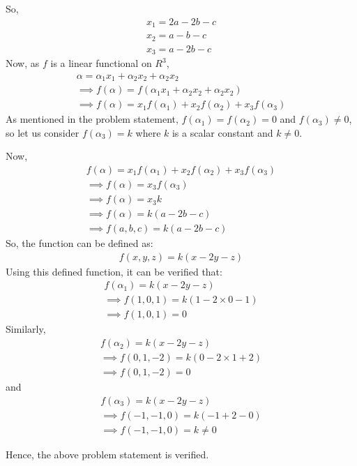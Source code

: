 \documentclass[journal,12pt,twocolumn]{IEEEtran}
\renewcommand\thesection{\arabic{section}}
\begin{document}
So, 
\begin{align}
x_1 = 2a-2b-c\\
x_2= a-b-c \\
x_3= a-2b-c
\end{align}
Now, as $f$ is a linear functional on $R^3$,
\begin{align}
\alpha = \alpha_1 x_1 + \alpha_2 x_2 + \alpha_2 x_2\\
\implies f(\alpha) = f(\alpha_1 x_1 + \alpha_2 x_2 + \alpha_2 x_2)\\
\implies f(\alpha) = x_1 f(\alpha_1) + x_2f(\alpha_2)+ x_3f(\alpha_3)
\end{align}
As mentioned in the problem statement, $f(\alpha_1)=f(\alpha_2)=0$ and $f(\alpha_3)\neq 0$, so let us consider $f(\alpha_3)= k$ where $k$ is a scalar constant and $k \neq 0$.

Now,
\begin{align}
f(\alpha) = x_1 f(\alpha_1) + x_2f(\alpha_2)+ x_3f(\alpha_3)\\
\implies f(\alpha) = x_3f(\alpha_3)\\
\implies f(\alpha) = x_3 k\\
\implies f(\alpha) = k (a-2b-c)\\
\implies f(a,b,c) = k (a-2b-c)
\end{align}
So, the function can be defined as:
\begin{align}
f(x,y,z) = k (x-2y-z)
\end{align}
Using this defined function, it can be verified that:
\begin{align}
f(\alpha_1) = k (x-2y-z)\\
\implies f(1,0,1)= k(1 - 2\times0 - 1)\\
\implies f(1,0,1)= 0
\end{align}
Similarly,
\begin{align}
f(\alpha_2) = k (x-2y-z)\\
\implies f(0,1,-2)= k(0 - 2\times1 + 2)\\
\implies f(0,1,-2)= 0
\end{align}
and 
\begin{align}
f(\alpha_3) = k (x-2y-z)\\
\implies f(-1,-1,0)= k(-1 + 2 - 0)\\
\implies f(-1,-1,0)= k \neq 0
\end{align}

Hence, the above problem statement is verified.
\end{document}
